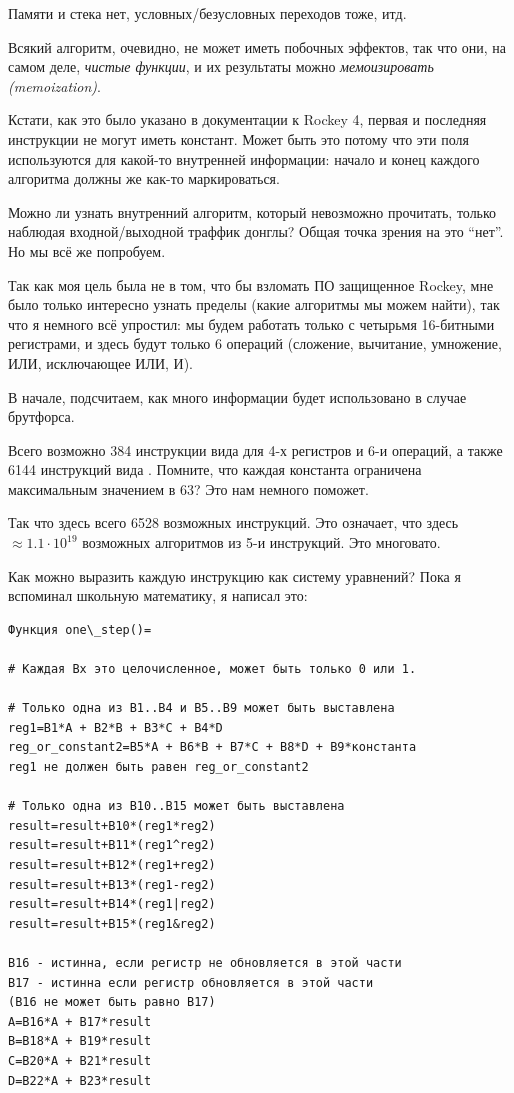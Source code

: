 Памяти и стека нет, условных/безусловных переходов тоже, итд.

Всякий алгоритм, очевидно, не может иметь побочных эффектов, так что они, на самом деле, \textit{чистые функции},
и их результаты можно \textit{мемоизировать (memoization)}.

Кстати, как это было указано в документации к Rockey 4, первая и последняя инструкции не могут иметь констант.
Может быть это потому что эти поля используются для какой-то внутренней информации:
начало и конец каждого алгоритма должны же как-то маркироваться.

Можно ли узнать внутренний алгоритм, который невозможно прочитать, только наблюдая входной/выходной траффик донглы?
Общая точка зрения на это ``нет''. Но мы всё же попробуем.

Так как моя цель была не в том, что бы взломать ПО защищенное Rockey,
мне было только интересно узнать пределы (какие алгоритмы мы можем найти),
так что я немного всё упростил: мы будем работать только с четырьмя 16-битными регистрами,
и здесь будут только 6 операций (сложение, вычитание, умножение, ИЛИ, исключающее ИЛИ, И).

В начале, подсчитаем, как много информации будет использовано в случае брутфорса.

Всего возможно 384 инструкции вида  для 4-х регистров и 6-и операций,
а также 6144 инструкций вида .
Помните, что каждая константа ограничена максимальным значением в 63? Это нам немного поможет.

Так что здесь всего 6528 возможных инструкций.
Это означает, что здесь $\approx 1.1 \cdot 10^{19}$ возможных алгоритмов из 5-и инструкций.
Это многовато.

Как можно выразить каждую инструкцию как систему уравнений?
Пока я вспоминал школьную математику, я написал это:

\begin{lstlisting}
Функция one\_step()=

# Каждая Bx это целочисленное, может быть только 0 или 1.

# Только одна из B1..B4 и B5..B9 может быть выставлена
reg1=B1*A + B2*B + B3*C + B4*D
reg_or_constant2=B5*A + B6*B + B7*C + B8*D + B9*константа
reg1 не должен быть равен reg_or_constant2

# Только одна из B10..B15 может быть выставлена
result=result+B10*(reg1*reg2)
result=result+B11*(reg1^reg2)
result=result+B12*(reg1+reg2)
result=result+B13*(reg1-reg2)
result=result+B14*(reg1|reg2)
result=result+B15*(reg1&reg2)

B16 - истинна, если регистр не обновляется в этой части
B17 - истинна если регистр обновляется в этой части
(B16 не может быть равно B17)
A=B16*A + B17*result
B=B18*A + B19*result
C=B20*A + B21*result
D=B22*A + B23*result
\end{lstlisting}

